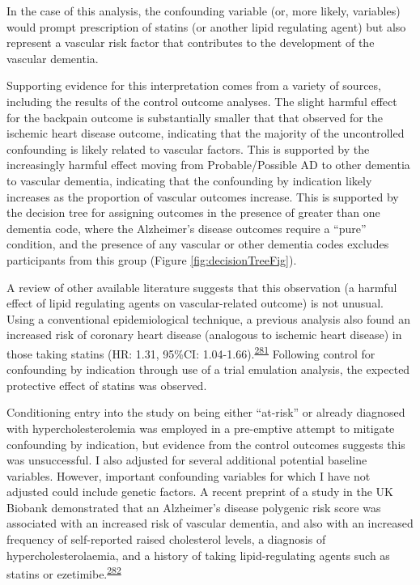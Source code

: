 \documentclass[a4paper, twoside]{templates/ociamthesis}
\begin{document}
In the case of this analysis, the confounding variable (or, more likely, variables) would prompt prescription of statins (or another lipid regulating agent) but also represent a vascular risk factor that contributes to the development of the vascular dementia.

Supporting evidence for this interpretation comes from a variety of sources, including the results of the control outcome analyses. The slight harmful effect for the backpain outcome is substantially smaller that that observed for the ischemic heart disease outcome, indicating that the majority of the uncontrolled confounding is likely related to vascular factors. This is supported by the increasingly harmful effect moving from Probable/Possible AD to other dementia to vascular dementia, indicating that the confounding by indication likely increases as the proportion of vascular outcomes increase. This is supported by the decision tree for assigning outcomes in the presence of greater than one dementia code, where the Alzheimer's disease outcomes require a ``pure'' condition, and the presence of any vascular or other dementia codes excludes participants from this group (Figure \ref{fig:decisionTreeFig}).

A review of other available literature suggests that this observation (a harmful effect of lipid regulating agents on vascular-related outcome) is not unusual. Using a conventional epidemiological technique, a previous analysis also found an increased risk of coronary heart disease (analogous to ischemic heart disease) in those taking statins (HR: 1.31, 95\%CI: 1.04-1.66).\textsuperscript{\protect\hyperlink{ref-danaei2013b}{281}} Following control for confounding by indication through use of a trial emulation analysis, the expected protective effect of statins was observed.

Conditioning entry into the study on being either ``at-risk'' or already diagnosed with hypercholesterolemia was employed in a pre-emptive attempt to mitigate confounding by indication, but evidence from the control outcomes suggests this was unsuccessful. I also adjusted for several additional potential baseline variables. However, important confounding variables for which I have not adjusted could include genetic factors. A recent preprint of a study in the UK Biobank demonstrated that an Alzheimer's disease polygenic risk score was associated with an increased risk of vascular dementia, and also with an increased frequency of self-reported raised cholesterol levels, a diagnosis of hypercholesterolaemia, and a history of taking lipid-regulating agents such as statins or ezetimibe.\textsuperscript{\protect\hyperlink{ref-korologou-linden2020}{282}}
\end{document}
